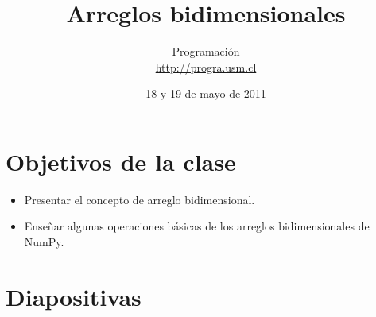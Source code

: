 \documentclass[10pt]{article}
\title{Arreglos bidimensionales}
\author{Programación \\ \url{http://progra.usm.cl}}
\date{18 y 19 de mayo de 2011}
\begin{document}
  \maketitle

  \section*{Objetivos de la clase}
  \begin{itemize}
    \item Presentar el concepto
      de arreglo bidimensional.
    \item Enseñar algunas operaciones básicas
      de los arreglos bidimensionales de NumPy.
  \end{itemize}

  \section*{Diapositivas}

\end{document}
